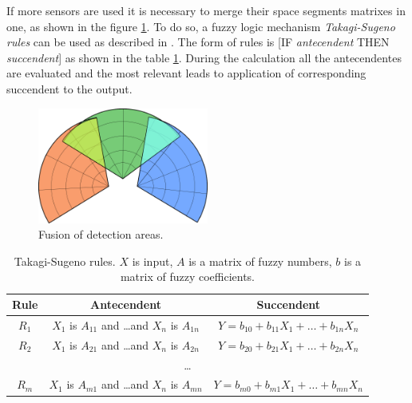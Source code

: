If more sensors are used it is necessary to merge their space segments matrixes in one,
as shown in the figure \ref{fig:3pir_area}. To do so, a fuzzy logic mechanism
{\it Takagi-Sugeno rules} can be used as described in \cite{InsightIntoFuzzyModelling}.
The form of rules is [IF {\it antecendent} THEN {\it succendent}] as shown in the table
\ref{table:takagisugeno}. During the calculation all the antecendentes are evaluated
and the most relevant leads to application of corresponding succendent to the output.

\begin{figure}[h!]
\begin{center}
\includegraphics[width=0.5\textwidth]{obrazky-figures/3pir_area.png}
\caption{Fusion of detection areas.\label{fig:3pir_area}}
\end{center}
\end{figure}

\begin{table}[h!]
\begin{center}
\begin{tabular}{|c|c|c|} \hline
\textbf{Rule}   & \textbf{Antecendent}                                & \textbf{Succendent}                             \\ \hline
$R_1$           & $X_1$ is $A_{11}$ and \dots and $X_n$ is $A_{1n}$   & $Y = b_{10} + b_{11}X_1 + \dots + b_{1n}X_n$    \\ \hline
$R_2$           & $X_1$ is $A_{21}$ and \dots and $X_n$ is $A_{2n}$   & $Y = b_{20} + b_{21}X_1 + \dots + b_{2n}X_n$    \\ \hline
\multicolumn{3}{|c|}{\dots}                                                                                             \\ \hline
$R_m$           & $X_1$ is $A_{m1}$ and \dots and $X_n$ is $A_{mn}$   & $Y = b_{m0} + b_{m1}X_1 + \dots + b_{mn}X_n$    \\ \hline
\end{tabular}
\caption{Takagi-Sugeno rules. $X$ is input, $A$ is a matrix of fuzzy numbers, $b$ is a matrix of fuzzy coefficients.\label{table:takagisugeno} \cite{InsightIntoFuzzyModelling}}
\end{center}
\end{table}

